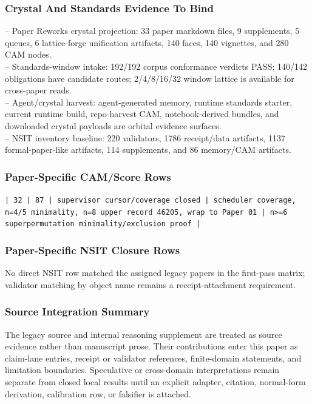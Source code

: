 \documentclass[11pt]{article}
\begin{document}
\subsubsection*{Crystal And Standards Evidence To Bind}

\noindent{}-- Paper Reworks crystal projection: 33 paper markdown files, 9 supplements, 5 queues, 6 lattice-forge unification artifacts, 140 faces, 140 vignettes, and 280 CAM nodes.\\
\noindent{}-- Standards-window intake: 192/192 corpus conformance verdicts PASS; 140/142 obligations have candidate routes; 2/4/8/16/32 window lattice is available for cross-paper reads.\\
\noindent{}-- Agent/crystal harvest: agent-generated memory, runtime standards starter, current runtime build, repo-harvest CAM, notebook-derived bundles, and downloaded crystal payloads are orbital evidence surfaces.\\
\noindent{}-- NSIT inventory baseline: 220 validators, 1786 receipt/data artifacts, 1137 formal-paper-like artifacts, 114 supplements, and 86 memory/CAM artifacts.\\

\subsubsection*{Paper-Specific CAM/Score Rows}

\noindent\texttt{| 32 | 87 | supervisor cursor/coverage closed | scheduler coverage, n=4/5 minimality, n=8 upper record 46205, wrap to Paper 01 | n>=6 superpermutation minimality/exclusion proof |}\\

\subsubsection*{Paper-Specific NSIT Closure Rows}

No direct NSIT row matched the assigned legacy papers in the first-pass matrix; validator matching by object name remains a receipt-attachment requirement.

\subsubsection*{Source Integration Summary}

The legacy source and internal reasoning supplement are treated as source
evidence rather than manuscript prose. Their contributions enter this paper as
claim-lane entries, receipt or validator references, finite-domain statements,
and limitation boundaries. Speculative or cross-domain interpretations remain
separate from closed local results until an explicit adapter, citation,
normal-form derivation, calibration row, or falsifier is attached.
\end{document}
